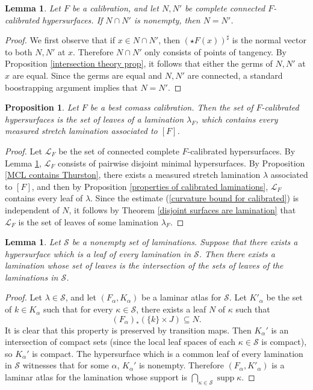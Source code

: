 \documentclass[reqno,11pt]{amsart}
\DeclareMathOperator{\supp}{supp}
\newtheorem{lemma}[theorem]{Lemma}
\newtheorem{proposition}[theorem]{Proposition}
\theoremstyle{definition}
\numberwithin{equation}{section}
\begin{document}
\begin{lemma}\label{calibrated implies disjoint}
Let $F$ be a calibration, and let $N, N'$ be complete connected $F$-calibrated hypersurfaces.
If $N \cap N'$ is nonempty, then $N = N'$.
\end{lemma}
\begin{proof}
We first observe that if $x \in N \cap N'$, then $(\star F(x))^\sharp$ is the normal vector to both $N, N'$ at $x$.
Therefore $N \cap N'$ only consists of points of tangency.
By Proposition \ref{intersection theory prop}, it follows that either the germs of $N, N'$ at $x$ are equal.
Since the germs are equal and $N, N'$ are connected, a standard boostrapping argument implies that $N = N'$.
\end{proof}

\begin{proposition}\label{existence of semicanonical lamination}
Let $F$ be a best comass calibration.
Then the set of $F$-calibrated hypersurfaces is the set of leaves of a lamination $\lambda_F$, which contains every measured stretch lamination associated to $[F]$.
\end{proposition}
\begin{proof}
Let $\mathscr L_F$ be the set of connected complete $F$-calibrated hypersurfaces.
By Lemma \ref{calibrated implies disjoint}, $\mathscr L_F$ consists of pairwise disjoint minimal hypersurfaces.
By Proposition \ref{MCL contains Thurston}, there exists a measured stretch lamination $\lambda$ associated to $[F]$, and then by Proposition \ref{properties of calibrated laminations}, $\mathscr L_F$ contains every leaf of $\lambda$.
Since the estimate (\ref{curvature bound for calibrated}) is independent of $N$, it follows by Theorem \ref{disjoint surfaces are lamination} that $\mathscr L_F$ is the set of leaves of some lamination $\lambda_F$.
\end{proof}

\begin{lemma}\label{existence of intersections}
Let $\mathscr S$ be a nonempty set of laminations.
Suppose that there exists a hypersurface which is a leaf of every lamination in $\mathscr S$.
Then there exists a lamination whose set of leaves is the intersection of the sets of leaves of the laminations in $\mathscr S$.
\end{lemma}
\begin{proof}
Let $\lambda \in \mathscr S$, and let $(F_\alpha, K_\alpha)$ be a laminar atlas for $\mathscr S$.
Let $K'_\alpha$ be the set of $k \in K_\alpha$ such that for every $\kappa \in \mathscr S$, there exists a leaf $N$ of $\kappa$ such that
$$(F_\alpha)_*(\{k\} \times J) \subseteq N.$$
It is clear that this property is preserved by transition maps.
Then $K_\alpha'$ is an intersection of compact sets (since the local leaf spaces of each $\kappa \in \mathscr S$ is compact), so $K_\alpha'$ is compact.
The hypersurface which is a common leaf of every lamination in $\mathscr S$ witnesses that for some $\alpha$, $K_\alpha'$ is nonempty.
Therefore $(F_\alpha, K'_\alpha)$ is a laminar atlas for the lamination whose support is $\bigcap_{\kappa \in \mathscr S} \supp \kappa$.
\end{proof}
\end{document}
